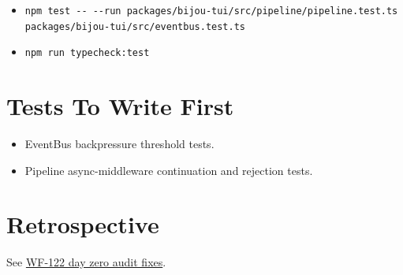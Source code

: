 \begin{itemize}
\tightlist
\item
  \texttt{n\allowbreak{}p\allowbreak{}m\allowbreak{} \allowbreak{}t\allowbreak{}e\allowbreak{}s\allowbreak{}t\allowbreak{} \allowbreak{}-\allowbreak{}-\allowbreak{} \allowbreak{}-\allowbreak{}-\allowbreak{}r\allowbreak{}u\allowbreak{}n\allowbreak{} \allowbreak{}p\allowbreak{}a\allowbreak{}c\allowbreak{}k\allowbreak{}a\allowbreak{}g\allowbreak{}e\allowbreak{}s\allowbreak{}/\allowbreak{}b\allowbreak{}i\allowbreak{}j\allowbreak{}o\allowbreak{}u\allowbreak{}-\allowbreak{}t\allowbreak{}u\allowbreak{}i\allowbreak{}/\allowbreak{}s\allowbreak{}r\allowbreak{}c\allowbreak{}/\allowbreak{}p\allowbreak{}i\allowbreak{}p\allowbreak{}e\allowbreak{}l\allowbreak{}i\allowbreak{}n\allowbreak{}e\allowbreak{}/\allowbreak{}p\allowbreak{}i\allowbreak{}p\allowbreak{}e\allowbreak{}l\allowbreak{}i\allowbreak{}n\allowbreak{}e\allowbreak{}.\allowbreak{}t\allowbreak{}e\allowbreak{}s\allowbreak{}t\allowbreak{}.\allowbreak{}t\allowbreak{}s\allowbreak{} \allowbreak{}p\allowbreak{}a\allowbreak{}c\allowbreak{}k\allowbreak{}a\allowbreak{}g\allowbreak{}e\allowbreak{}s\allowbreak{}/\allowbreak{}b\allowbreak{}i\allowbreak{}j\allowbreak{}o\allowbreak{}u\allowbreak{}-\allowbreak{}t\allowbreak{}u\allowbreak{}i\allowbreak{}/\allowbreak{}s\allowbreak{}r\allowbreak{}c\allowbreak{}/\allowbreak{}e\allowbreak{}v\allowbreak{}e\allowbreak{}n\allowbreak{}t\allowbreak{}b\allowbreak{}u\allowbreak{}s\allowbreak{}.\allowbreak{}t\allowbreak{}e\allowbreak{}s\allowbreak{}t\allowbreak{}.\allowbreak{}t\allowbreak{}s}
\item
  \texttt{n\allowbreak{}p\allowbreak{}m\allowbreak{} \allowbreak{}r\allowbreak{}u\allowbreak{}n\allowbreak{} \allowbreak{}t\allowbreak{}y\allowbreak{}p\allowbreak{}e\allowbreak{}c\allowbreak{}h\allowbreak{}e\allowbreak{}c\allowbreak{}k\allowbreak{}:\allowbreak{}t\allowbreak{}e\allowbreak{}s\allowbreak{}t}
\end{itemize}

\section{Tests To Write First}\label{record-166-tests-to-write-first}

\begin{itemize}
\tightlist
\item
  EventBus backpressure threshold tests.
\item
  Pipeline async-middleware continuation and rejection tests.
\end{itemize}

\section{Retrospective}\label{record-166-retrospective}

See \href{https://github.com/flyingrobots/bijou/blob/cbd70612140e7a450d764b3c7be1c6af878b99bc/docs/method/retro/WF-122-day-zero-audit-fixes.md}{WF-122 day zero audit fixes}.

